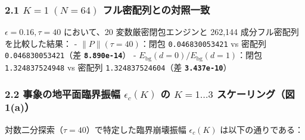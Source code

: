 \documentclass[
  a4paper,
]{ltjsarticle}
\begin{document}
\subsubsection{\texorpdfstring{2.1 \(K=1\;(N=64)\)
フル密配列との対照一致}{2.1 K=1\textbackslash;(N=64) フル密配列との対照一致}}\label{k1n64-ux30d5ux30ebux5bc6ux914dux5217ux3068ux306eux5bfeux7167ux4e00ux81f4}

\(\epsilon = 0.16, \tau = 40\) において、20 変数厳密閉包エンジンと
262,144 成分フル密配列を比較した結果： - \(\|P\|(\tau=40)\)：閉包
\texttt{0.046830053421} vs 密配列 \texttt{0.046830053421}（差
\textbf{\texttt{8.890e-14}}） -
\(E_{\mathrm{bg}}(d=0)/E_{\mathrm{bg}}(d=1)\)：閉包
\texttt{1.324837524948} vs 密配列 \texttt{1.324837524604}（差
\textbf{\texttt{3.437e-10}}）

\subsubsection{\texorpdfstring{2.2 事象の地平面臨界振幅
\(\epsilon_c(K)\) の \(K=1\dots 3\) スケーリング（図
1(a)）}{2.2 事象の地平面臨界振幅 \textbackslash epsilon\_c(K) の K=1\textbackslash dots 3 スケーリング（図 1(a)）}}\label{ux4e8bux8c61ux306eux5730ux5e73ux9762ux81e8ux754cux632fux5e45-epsilon_ck-ux306e-k1dots-3-ux30b9ux30b1ux30fcux30eaux30f3ux30b0ux56f3-1a}

対数二分探索（\(\tau=40\)）で特定した臨界崩壊振幅 \(\epsilon_c(K)\)
は以下の通りである：
\end{document}
